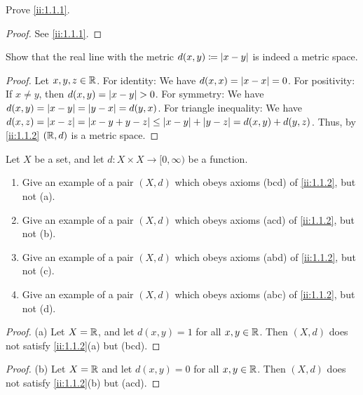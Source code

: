 \exercisesection

\begin{ex}\label{ii:ex:1.1.1}
  Prove \cref{ii:1.1.1}.
\end{ex}

\begin{proof}
  See \cref{ii:1.1.1}.
\end{proof}

\begin{ex}\label{ii:ex:1.1.2}
  Show that the real line with the metric \(d(x, y) \coloneqq \left\lvert x - y\right\rvert\) is indeed a metric space.
\end{ex}

\begin{proof}
  Let \(x, y, z \in \mathbb{R}\).
  For identity:
  We have \(d(x, x) = \left\lvert x - x\right\rvert = 0\).
  For positivity:
  If \(x \neq y\), then \(d(x, y) = \left\lvert x - y\right\rvert > 0\).
  For symmetry:
  We have \(d(x, y) = \left\lvert x - y\right\rvert = \left\lvert y - x\right\rvert = d(y, x)\).
  For triangle inequality:
  We have \(d(x, z) = \left\lvert x - z\right\rvert = \left\lvert x - y + y - z\right\rvert \leq \left\lvert x - y\right\rvert + \left\lvert y - z\right\rvert = d(x, y) + d(y, z)\).
  Thus, by \cref{ii:1.1.2} \((\mathbb{R}, d)\) is a metric space.
\end{proof}

\begin{ex}\label{ii:ex:1.1.3}
  Let \(X\) be a set, and let \(d : X \times X \to [0, \infty)\) be a function.
  \begin{enumerate}
    \item Give an example of a pair \((X, d)\) which obeys axioms (bcd) of \cref{ii:1.1.2}, but not (a).
    \item Give an example of a pair \((X, d)\) which obeys axioms (acd) of \cref{ii:1.1.2}, but not (b).
    \item Give an example of a pair \((X, d)\) which obeys axioms (abd) of \cref{ii:1.1.2}, but not (c).
    \item Give an example of a pair \((X, d)\) which obeys axioms (abc) of \cref{ii:1.1.2}, but not (d).
  \end{enumerate}
\end{ex}

\begin{proof}{(a)}
  Let \(X = \mathbb{R}\), and let \(d(x, y) = 1\) for all \(x, y \in \mathbb{R}\).
  Then \((X, d)\) does not satisfy \cref{ii:1.1.2}(a) but (bcd).
\end{proof}

\begin{proof}{(b)}
  Let \(X = \mathbb{R}\) and let \(d(x, y) = 0\) for all \(x, y \in \mathbb{R}\).
  Then \((X, d)\) does not satisfy \cref{ii:1.1.2}(b) but (acd).
\end{proof}

